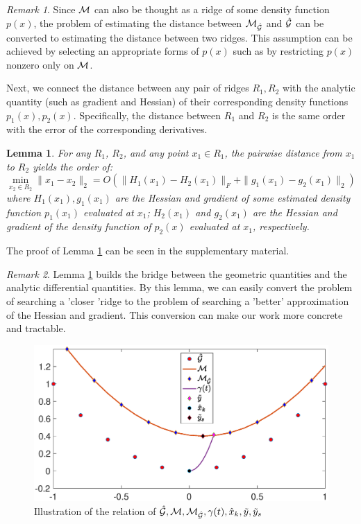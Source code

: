 \documentclass[aos,preprint]{imsart}
\newtheorem{lemma}[theorem]{Lemma}
\theoremstyle{remark}
\newtheorem*{remark}{Remark}
\begin{document}
\begin{remark}
Since $\cal M$ can also be thought as a ridge of some density function $p(x)$, the problem of estimating the distance between $\cal M_{\hat{\cal G}}$ and $\hat{\cal G}$ can be converted to estimating the distance between two ridges. 
This assumption can be achieved by selecting an appropriate forms of $p(x)$ such as by restricting $p(x)$ nonzero only on $\cal M$. 
\end{remark}
Next, we connect the distance between any pair of ridges $R_1, R_2$ with the analytic quantity (such as gradient and Hessian) of their corresponding density functions $p_1(x), p_2(x)$. 
Specifically, the  distance between $R_1$ and $R_2$ is the same order with the error of the corresponding derivatives. 
\begin{lemma}{ 
For any $R_1$, $R_2$, and any point $x_1\in R_1$, the pairwise distance from $x_1$ to $R_2$ yields the order of: %
\[
\min_{x_2\in R_2}\|x_1-x_2\|_2 = O(\|H_1(x_1)-H_2(x_1)\|_F+\|g_1(x_1)-g_2(x_1)\|_2)
\]
where $H_1(x_1), g_1 (x_1)$ are the Hessian and gradient of some estimated density function $p_1(x_1)$ evaluated at $x_1$; $H_2(x_1)$ and $g_2(x_1)$ are the Hessian and gradient of the density function of $p_2(x)$ evaluated at $x_1$, respectively.
 }\label{margin}
\end{lemma}
The proof of Lemma \ref{margin} can be seen in the supplementary material.%
\begin{remark}
Lemma \ref{margin} builds the bridge between the geometric quantities and the analytic differential quantities. By this lemma, we can easily convert the problem of searching a 'closer 'ridge to the problem of searching a 'better' approximation of the Hessian and gradient. This conversion can make our work more concrete and tractable.
\end{remark}
\begin{figure}[htbp] %
   \centering
   \includegraphics[width=0.8\linewidth]{demoMG.eps} 
   \caption{Illustration of the relation of $\hat{\cal G},{\cal M}, {\cal M}_{\cal \hat{G}}, \gamma(t),\hat{x}_k, \tilde{y}, \tilde{y}_s$}
   \label{fig:example}
\end{figure}
\end{document}
